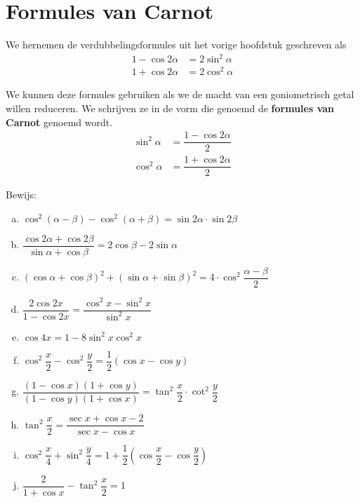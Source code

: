 \documentclass[a4paper,12pt]{article}
\begin{document}
\pagebreak
\section{Formules van Carnot}

\begin{theorie}

We hernemen de verdubbelingsformules uit het vorige hoofdstuk geschreven als
\begin{align*}
  1 - \cos 2\alpha &= 2\sin^2\alpha\\
  1 + \cos 2\alpha &= 2\cos^2\alpha
\end{align*}

We kunnen deze formules gebruiken als we de macht van een goniometrisch getal willen reduceren. We schrijven ze in de vorm die genoemd de {\bf formules van Carnot} genoemd wordt.
\begin{align*}
  \sin^2\alpha &= \dfrac{1 - \cos 2\alpha}{2}\\
  \cos^2\alpha &= \dfrac{1 + \cos 2\alpha}{2}
\end{align*}

\end{theorie}

\begin{oefening} %
Bewijs:
\begin{enumerate}[(a)]
  \itemsep.5em
  \item $\displaystyle \cos^2(\alpha - \beta) - \cos^2(\alpha + \beta) = \sin 2\alpha \cdot \sin 2\beta$
  \item $\displaystyle \dfrac{\cos 2\alpha + \cos 2\beta}{\sin\alpha + \cos\beta} = 2\cos\beta - 2\sin\alpha$
  \item $\displaystyle (\cos\alpha + \cos\beta)^2 + (\sin\alpha + \sin\beta)^2 = 4\cdot\cos^2\dfrac{\alpha-\beta}{2}$
  \item $\displaystyle \dfrac{2\cos 2x}{1-\cos 2x} = \dfrac{\cos^2 x - \sin^2 x}{\sin^2 x}$
  \item $\displaystyle \cos 4x = 1 - 8\sin^2 x \cos^2 x$
  \item $\displaystyle \cos^2 \dfrac{x}{2} - \cos^2 \dfrac{y}{2} = \dfrac{1}{2}\left(\cos x - \cos y \right)$
  \item $\displaystyle \dfrac{(1 - \cos x)(1 + \cos y)}{(1 - \cos y)(1 + \cos x)} = \tan^2 \dfrac{x}{2} \cdot \cot^2 \dfrac{y}{2}$
  \item $\displaystyle \tan^2 \dfrac{x}{2} = \dfrac{\sec x + \cos x - 2}{\sec x - \cos x}$
  \item $\displaystyle \cos^2 \dfrac{x}{4} + \sin^2 \dfrac{y}{4} = 1 + \dfrac{1}{2}\left( \cos \dfrac{x}{2} - \cos \dfrac{y}{2} \right)$
  \item $\displaystyle \dfrac{2}{1 + \cos x} - \tan^2 \dfrac{x}{2} = 1$
\end{enumerate}
\end{oefening}
\end{document}
